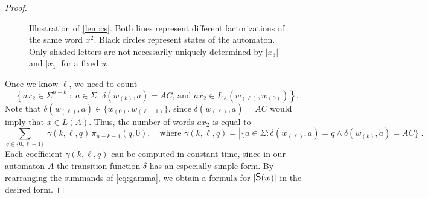 \documentclass{article}
\newcommand{\mayqed}{}
\newcommand{\CS}{\mbox{\large{\sf{S}}}}
\theoremstyle{definition}
\theoremstyle{remark}
\begin{document}
\begin{proof}
\begin{figure}[htpb]
{
 }
\caption{\label{fig:proof}
  Illustration of \cref{lem:cs}.
  Both lines represent different factorizations of the same word $x^2$.
  Black circles represent states of the automaton.
  Only shaded letters are not necessarily uniquely determined by $|x_3|$ and $|x_1|$ for a fixed $w$.
}
\end{figure}
  
  Once we know $\ell$, we need to count
  $$\left\{ax_2 \in \Sigma^{n-k}\;:\; a\in\Sigma \text{, }\delta(w_{(k)},a)=AC\text{, and } ax_2\in L_A(w_{(\ell)},w_{(0)}) \right\}.$$
  Note that $\delta(w_{(\ell)},a)\in\{w_{(0)},w_{(\ell+1)}\}$, since $\delta(w_{(\ell)},a)=AC$ would
  imply that $x \in L(A)$.
  Thus, the number of words $ax_2$ is equal to
  \begin{equation}\label{eq:gamma}
    \sum_{q\in \{0,\ell+1\}}\ \gamma(k,\ell,q)\,\pi_{n-k-1}(q,0), \quad\mbox{where } \gamma(k,\ell,q)=|\{a\in \Sigma: \delta(w_{(\ell)},a)=q\wedge \delta(w_{(k)},a)=AC\}|.
  \end{equation}
  Each coefficient $\gamma(k,\ell,q)$ can be computed in constant time, since in our automaton $A$
  the transition function $\delta$ has an especially simple form.
  By rearranging the summands of \eqref{eq:gamma}, we obtain a formula for $|\CS(w)|$
  in the desired form.
\mayqed\end{proof}
\end{document}
